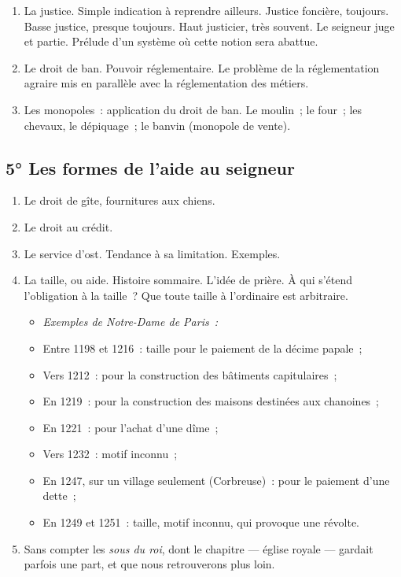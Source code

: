 \documentclass[french,twoside]{book} %
\newlength{\listmod}
\newcommand{\listhead}[1]{\hspace{-1\listmod}\emph{#1}}
\begin{document}
\begin{enumerate}[itemsep=0pt,]
\item La justice. Simple indication à reprendre ailleurs. Justice foncière, toujours. Basse justice, presque toujours. Haut justicier, très souvent. Le seigneur juge et partie. Prélude d’un système où cette notion sera abattue.
\item Le droit de ban. Pouvoir réglementaire. Le problème de la réglementation agraire mis en parallèle avec la réglementation des métiers.
\item Les monopoles : application du droit de ban. Le moulin ; le four ; les chevaux, le dépiquage ; le banvin (monopole de vente).
\end{enumerate}

\subsection[{5° Les formes de l’aide au seigneur}]{5° Les formes de l’aide au seigneur}

\begin{enumerate}[itemsep=\baselineskip,]
\item Le droit de gîte, fournitures aux chiens.
\item Le droit au crédit.
\item Le service d’ost. Tendance à sa limitation. Exemples.
\item  La taille, ou aide. Histoire sommaire. L’idée de prière. À qui s’étend l’obligation à la taille ? Que toute taille à l’ordinaire est arbitraire.\par
 
\begin{itemize}[itemsep=0pt,]
\item[]\listhead{Exemples de Notre-Dame de Paris :}
\item Entre 1198 et 1216 : taille pour le paiement de la décime papale ;
\item Vers 1212 : pour la construction des bâtiments capitulaires ;
\item En 1219 : pour la construction des maisons destinées aux chanoines ;
\item En 1221 : pour l’achat d’une dîme ;
\item Vers 1232 : motif inconnu ;
\item En 1247, sur un village seulement (Corbreuse) : pour le paiement d’une dette ;
\item En 1249 et 1251 : taille, motif inconnu, qui provoque une révolte.
\end{itemize}

 
\item Sans compter les \emph{sous du roi}, dont le chapitre — église royale — gardait parfois une part, et que nous retrouverons plus loin.
\end{enumerate}
\end{document}
